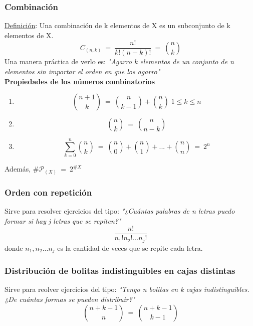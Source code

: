 \documentclass{article}
\newcommand{\eq}{\:=\:}                                 %
\begin{document}
\subsubsection*{Combinación}
\underline{Definición}: Una combinación de k elementos de X es un subconjunto de k elementos de X.
\begin{equation*}
    C_{(n,k)} \eq \frac{n!}{k!(n-k)!} \eq \binom{n}{k} 
\end{equation*}
Una manera práctica de verlo es: \emph{"Agarro k elementos de un conjunto de n elementos sin importar el orden en que los agarro"}
\pagebreak[1]\\\textbf{Propiedades de los números combinatorios}
\begin{enumerate}
    \item \begin{equation*}
        \binom{n + 1}{k} \eq \binom{n}{k - 1} + \binom{n}{k} \;1 \leq k \leq n
    \end{equation*}
    \item \begin{equation*}
        \binom{n}{k} \eq \binom{n}{n - k}
    \end{equation*}
    \item \begin{equation*}
        \sum^n _{k=0} \binom{n}{k} \eq \binom{n}{0} + \binom{n}{1} + ... + \binom{n}{n} \eq 2^n
    \end{equation*}
\end{enumerate}
Además, $\#\mathcal{P}_{(X)} \eq 2^{\#X}$
\subsubsection*{Orden con repetición}
Sirve para resolver ejercicios del tipo: \emph{"¿Cuántas palabras de n letras puedo formar si hay j letras que se repiten?"}
\begin{equation*}
    \frac{n!}{n_1!n_2!...n_j!} 
\end{equation*}
    donde $n_1, n_2... n_j$ es la cantidad de veces que se repite cada letra.
\subsubsection*{Distribución de bolitas indistinguibles en cajas distintas}
Sirve para reolver ejercicios del tipo: \emph{"Tengo n bolitas en k cajas indistinguibles. ¿De cuántas formas se pueden distribuir?"}
\begin{equation*}
    \binom{n+k-1}{n} \eq \binom{n+k-1}{k-1}
\end{equation*}
\pagebreak
\end{document}
